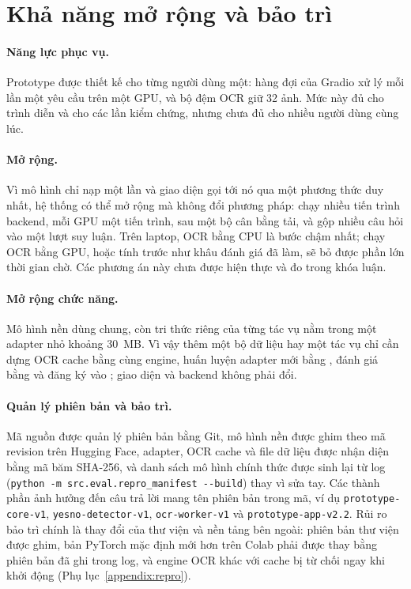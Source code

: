 \section{Khả năng mở rộng và bảo trì}
\label{sec:sd-scale}

\paragraph{Năng lực phục vụ.} Prototype được thiết kế cho từng người dùng một: hàng đợi của
Gradio xử lý mỗi lần một yêu cầu trên một GPU, và bộ đệm OCR giữ 32 ảnh. Mức này đủ cho trình
diễn và cho các lần kiểm chứng, nhưng chưa đủ cho nhiều người dùng cùng lúc.

\paragraph{Mở rộng.} Vì mô hình chỉ nạp một lần và giao diện gọi tới nó qua một phương thức
duy nhất, hệ thống có thể mở rộng mà không đổi phương pháp: chạy nhiều tiến trình backend,
mỗi GPU một tiến trình, sau một bộ cân bằng tải, và gộp nhiều câu hỏi vào một lượt suy luận.
Trên laptop, OCR bằng CPU là bước chậm nhất; chạy OCR bằng GPU, hoặc tính trước như khâu đánh
giá đã làm, sẽ bỏ được phần lớn thời gian chờ. Các phương án này chưa được hiện thực và đo
trong khóa luận.

\paragraph{Mở rộng chức năng.} Mô hình nền dùng chung, còn tri thức riêng của từng tác vụ nằm
trong một adapter nhỏ khoảng 30~MB. Vì vậy thêm một bộ dữ liệu hay một tác vụ chỉ cần dựng OCR
cache bằng cùng engine, huấn luyện adapter mới bằng , đánh
giá bằng  và đăng ký vào ;
giao diện và backend không phải đổi.

\paragraph{Quản lý phiên bản và bảo trì.} Mã nguồn được quản lý phiên bản bằng Git, mô hình
nền được ghim theo mã revision trên Hugging Face, adapter, OCR cache và file dữ liệu được nhận
diện bằng mã băm SHA-256, và danh sách mô hình chính thức được sinh lại từ log
(\texttt{python -m src.eval.repro\_manifest -{}-build}) thay vì sửa tay. Các thành phần ảnh
hưởng đến câu trả lời mang tên phiên bản trong mã, ví dụ \texttt{prototype-core-v1},
\texttt{yesno-detector-v1}, \texttt{ocr-worker-v1} và \texttt{prototype-app-v2.2}. Rủi ro bảo
trì chính là thay đổi của thư viện và nền tảng bên ngoài: phiên bản thư viện được ghim, bản
PyTorch mặc định mới hơn trên Colab phải được thay bằng phiên bản đã ghi trong log, và engine
OCR khác với cache bị từ chối ngay khi khởi động (Phụ lục~\ref{appendix:repro}).
